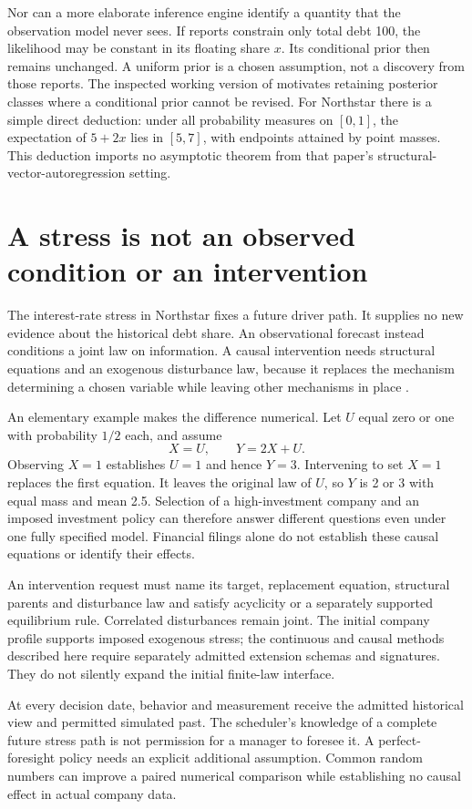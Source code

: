 Nor can a more elaborate inference engine identify a quantity that the
observation model never sees. If reports constrain only total debt 100, the
likelihood may be constant in its floating share $x$. Its conditional prior
then remains unchanged. A uniform prior is a chosen assumption, not a discovery
from those reports. The inspected working version of
\citet[Sections 2.1--2.3, equations (2.2)--(2.4)]{giacomini2021} motivates
retaining posterior classes where a conditional prior cannot be revised.
For Northstar there is a simple direct deduction: under all probability
measures on $[0,1]$, the expectation of $5+2x$ lies in $[5,7]$, with endpoints
attained by point masses. This deduction imports no asymptotic theorem from
that paper's structural-vector-autoregression setting.

\section{A stress is not an observed condition or an intervention}

The interest-rate stress in Northstar fixes a future driver path. It supplies
no new evidence about the historical debt share. An observational forecast
instead conditions a joint law on information. A causal intervention needs
structural equations and an exogenous disturbance law, because it replaces
the mechanism determining a chosen variable while leaving other mechanisms
in place \citep[Section 3.2, equations (5)--(9) and (15)--(17)]{pearl2009}.

An elementary example makes the difference numerical. Let $U$ equal zero or
one with probability $1/2$ each, and assume
\[
       X=U,\qquad Y=2X+U.
\]
Observing $X=1$ establishes $U=1$ and hence $Y=3$. Intervening to set $X=1$
replaces the first equation. It leaves the original law of $U$, so $Y$ is 2 or
3 with equal mass and mean 2.5. Selection of a high-investment company and an
imposed investment policy can therefore answer different questions even under
one fully specified model. Financial filings alone do not establish these
causal equations or identify their effects.

An intervention request must name its target, replacement equation, structural
parents and disturbance law and satisfy acyclicity or a separately supported
equilibrium rule. Correlated disturbances remain joint. The initial company
profile supports imposed exogenous stress; the continuous and causal methods
described here require separately admitted extension schemas and signatures.
They do not silently expand the initial finite-law interface.

At every decision date, behavior and measurement receive the admitted historical
view and permitted simulated past. The scheduler's knowledge of a complete
future stress path is not permission for a manager to foresee it. A perfect-
foresight policy needs an explicit additional assumption. Common random numbers
can improve a paired numerical comparison while establishing no causal effect
in actual company data.
